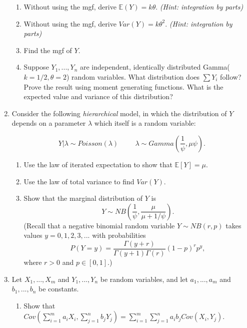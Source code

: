 \documentclass[11pt]{article}
\begin{document}
\begin{enumerate}
\begin{enumerate}

\item Without using the mgf, derive $\mathbb{E}(Y) = k \theta$. \textit{(Hint: integration by parts)}

\item Without using the mgf, derive $Var(Y) = k \theta^2$. \textit{(Hint: integration by parts)}

\item Find the mgf of $Y$.

\item Suppose $Y_1, ..., Y_n$ are independent, identically distributed Gamma($k=1/2, \theta=2$) random variables.  What distribution does $\sum Y_i$ follow?  Prove the result using moment generating functions.  What is the expected value and variance of this distribution?\\
\end{enumerate}

\item Consider the following \textit{hierarchical} model, in which the distribution of $Y$ depends on a parameter $\lambda$ which itself is a random variable:

$$Y | \lambda \sim Poisson(\lambda) \hspace{1cm} \lambda \sim Gamma\left(\dfrac{1}{\psi}, \mu \psi\right).$$

\begin{enumerate}
\item Use the law of iterated expectation to show that $\mathbb{E}[Y] = \mu$.

\item Use the law of total variance to find $Var(Y)$.

\item Show that the marginal distribution of $Y$ is 
$$Y \sim NB \left( \dfrac{1}{\psi}, \dfrac{\mu}{\mu + 1/\psi}\right).$$
(Recall that a negative binomial random variable $Y \sim NB(r, p)$ takes values $y = 0, 1, 2, 3, ...$ with probabilities
$$P(Y = y) = \dfrac{\Gamma(y + r)}{\Gamma(y + 1)\Gamma(r)} (1 - p)^r p^y,$$
where $r > 0$ and $p \in [0,1]$.)
\end{enumerate}

\item Let $X_1,...,X_m$ and $Y_1,...,Y_n$ be random variables, and let $a_1,...,a_m$ and $b_1,...,b_n$ be constants.

\begin{enumerate}
\item Show that $Cov\left( \sum \limits_{i=1}^m a_i X_i, \sum \limits_{j=1}^n b_j Y_j \right) = \sum \limits_{i=1}^m \sum \limits_{j=1}^n a_i b_j Cov(X_i, Y_j)$.


\end{enumerate}
\end{enumerate}
\end{document}
